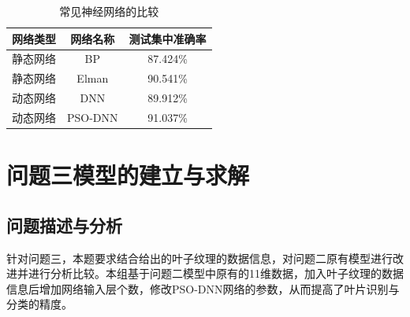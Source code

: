 \documentclass{whutmod}
\begin{document}
		\begin{table}[H]
	 \centering	\caption{常见神经网络的比较}\label{heng}
		\begin{tabular}{ccc}
			\toprule[2pt]
			\multicolumn{1}{m{3cm}}{\centering 网络类型}
			 & \multicolumn{1}{m{3cm}}{\centering 网络名称}
			  &\multicolumn{1}{m{4cm}}{\centering 测试集中准确率}
			  \\
			\midrule[1pt]
			静态网络	 &  BP &87.424\%  \\ 
			静态网络	 &  Elman &90.541\%  \\ 
			动态网络	 &  DNN &89.912\%  \\ 
			动态网络	 &  PSO-DNN &91.037\%  \\ 
			\bottomrule[2pt]	
		\end{tabular}

	\end{table}



	\section{问题三模型的建立与求解}
    \subsection{问题描述与分析}
    针对问题三，本题要求结合给出的叶子纹理的数据信息，对问题二原有模型进行改进并进行分析比较。本组基于问题二模型中原有的11维数据，加入叶子纹理的数据信息后增加网络输入层个数，修改PSO-DNN网络的参数，从而提高了叶片识别与分类的精度。
		
\end{document}
